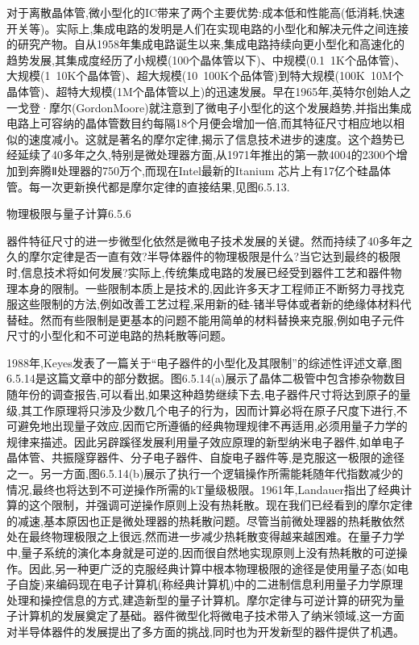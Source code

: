对于离散晶体管,微小型化的IC带来了两个主要优势:成本低和性能高(低消耗,快速开关等)。实际上,集成电路的发明是人们在实现电路的小型化和解决元件之间连接的研究产物。自从1958年集成电路诞生以来,集成电路持续向更小型化和高速化的趋势发展,其集成度经历了小规模(100个晶体管以下)、中规模(0.1~1K个品体管)、大规模(1~10K个晶体管)、超大规模(10~100K个品体管)到特大规模(100K~10M个晶体管)、超特大规模(1M个晶体管以上)的迅速发展。早在1965年,英特尔创始人之一戈登·摩尔(GordonMoore)就注意到了微电子小型化的这个发展趋势,并指出集成电路上可容纳的晶体管数目约每隔18个月便会增加一倍,而其特征尺寸相应地以相似的速度减小。这就是著名的摩尔定律,揭示了信息技术进步的速度。这个趋势已经延续了40多年之久,特别是微处理器方面,从1971年推出的第一款4004的2300个增加到奔腾Ⅱ处理器的750万个,而现在Intel最新的Itanium 芯片上有17亿个硅晶体管。每一次更新换代都是摩尔定律的直接结果,见图6.5.13.



物理极限与量子计算6.5.6

器件特征尺寸的进一步微型化依然是微电子技术发展的关键。然而持续了40多年之久的摩尔定律是否一直有效?半导体器件的物理极限是什么?当它达到最终的极限时,信息技术将如何发展?实际上,传统集成电路的发展已经受到器件工艺和器件物理本身的限制。一些限制本质上是技术的,因此许多天才工程师正不断努力寻找克服这些限制的方法,例如改善工艺过程,采用新的硅-锗半导体或者新的绝缘体材料代替硅。然而有些限制是更基本的问题不能用简单的材料替换来克服,例如电子元件尺寸的小型化和不可逆电路的热耗散等问题。

1988年,Keyes发表了一篇关于“电子器件的小型化及其限制”的综述性评述文章,图6.5.14是这篇文章中的部分数据。图6.5.14(a)展示了晶体二极管中包含掺杂物数目随年份的调查报告,可以看出,如果这种趋势继续下去,电子器件尺寸将达到原子的量级,其工作原理将只涉及少数几个电子的行为，因而计算必将在原子尺度下进行,不可避免地出现量子效应,因而它所遵循的经典物理规律不再适用,必须用量子力学的规律来描述。因此另辟蹊径发展利用量子效应原理的新型纳米电子器件,如单电子晶体管、共振隧穿器件、分子电子器件、自旋电子器件等,是克服这一极限的途径之一。另一方面,图6.5.14(b)展示了执行一个逻辑操作所需能耗随年代指数减少的情况,最终也将达到不可逆操作所需的kT量级极限。1961年,Landauer指出了经典计算的这个限制，并强调可逆操作原则上没有热耗散。现在我们已经看到的摩尔定律的减速,基本原因也正是微处理器的热耗散问题。尽管当前微处理器的热耗散依然处在最终物理极限之上很远,然而进一步减少热耗散变得越来越困难。在量子力学中,量子系统的演化本身就是可逆的,因而很自然地实现原则上没有热耗散的可逆操作。因此,另一种更广泛的克服经典计算中根本物理极限的途径是使用量子态(如电子自旋)来编码现在电子计算机(称经典计算机)中的二进制信息利用量子力学原理处理和操控信息的方式,建造新型的量子计算机。摩尔定律与可逆计算的研究为量子计算机的发展奠定了基础。器件微型化将微电子技术带入了纳米领域,这一方面对半导体器件的发展提出了多方面的挑战,同时也为开发新型的器件提供了机遇。



